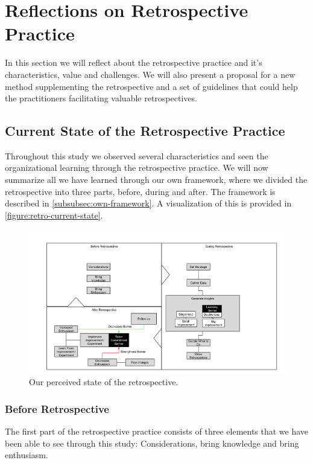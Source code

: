 \clearpage

\section{Reflections on Retrospective Practice}
In this section we will reflect about the retrospective practice and it's characteristics, value and challenges. We will also present a proposal for a new method supplementing the retrospective and a set of guidelines that could help the practitioners facilitating valuable retrospectives. 

\subsection{Current State of the Retrospective Practice}
Throughout this study we observed several characteristics and seen the organizational learning through the retrospective practice. We will now summarize all we have learned through our own framework, where we divided the retrospective into three parts, before, during and after. The framework is described in \autoref{subsubsec:own-framework}. A visualization of this is provided in \autoref{figure:retro-current-state}. 

\begin{figure}
	\centering
	\includegraphics[width=\textwidth, keepaspectratio]{figures/retro-outcome.png}
	\caption{Our perceived state of the retrospective.}
	\label{figure:retro-current-state}
\end{figure}

\afterpage{\clearpage}

\subsubsection{Before Retrospective}
The first part of the retrospective practice consists of three elements that we have been able to see through this study: Considerations, bring knowledge and bring enthusiasm. 

